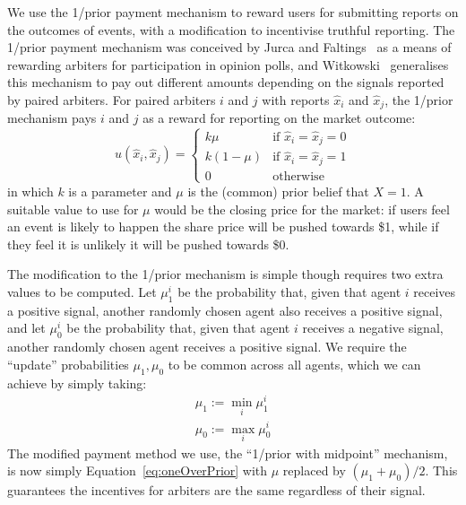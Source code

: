 \documentclass[10pt,a4paper]{article}
\theoremstyle{plain}
\theoremstyle{definition}
\begin{document}
We use the 1/prior payment mechanism to reward users for submitting reports on
the outcomes of events, with a modification to incentivise truthful reporting.
The 1/prior payment mechanism was conceived by Jurca and
Faltings~\cite{JurcaFaltings2008, JurcaFaltings2011} as a means of rewarding
arbiters for participation in opinion polls, and Witkowski~\cite{Witkowski2014}
generalises this mechanism to pay out different amounts depending on the
signals reported by paired arbiters. For paired arbiters $i$ and $j$ with
reports $\hat{x}_i$ and $\hat{x}_j$, the 1/prior mechanism pays $i$ and $j$ as
a reward for reporting on the market outcome:
%
\begin{equation}
	\label{eq:oneOverPrior}
	u(\hat{x}_i, \hat{x}_j) =
	\begin{cases}
		k \mu & \text{if } \hat{x}_i = \hat{x}_j = 0 \\
		k (1-\mu) & \text{if } \hat{x}_i = \hat{x}_j = 1 \\
		0 & \text{otherwise}
	\end{cases}
\end{equation}
%
in which $k$ is a parameter and $\mu$ is the (common) prior belief that $X=1$.
A suitable value to use for $\mu$ would be the closing price for the market: if
users feel an event is likely to happen the share price will be pushed towards
\$1, while if they feel it is unlikely it will be pushed towards \$0.

The modification to the 1/prior mechanism is simple though requires two extra
values to be computed. Let $\mu_1^i$ be the probability that, given that agent
$i$ receives a positive signal, another randomly chosen agent also receives a
positive signal, and let $\mu_0^i$ be the probability that, given that agent
$i$ receives a negative signal, another randomly chosen agent receives a
positive signal. We require the ``update'' probabilities $\mu_1, \mu_0$ to be
common across all agents, which we can achieve by simply taking:
%
\begin{equation}
	\begin{gathered}
		\mu_1 := \min_i \mu_1^i \\
		\mu_0 := \max_i \mu_0^i
	\end{gathered}
\end{equation}
%
The modified payment method we use, the ``1/prior with midpoint'' mechanism, is
now simply Equation~\ref{eq:oneOverPrior} with $\mu$ replaced by $(\mu_1 +
\mu_0)/2$. This guarantees the incentives for arbiters are the same regardless
of their signal.
\end{document}

